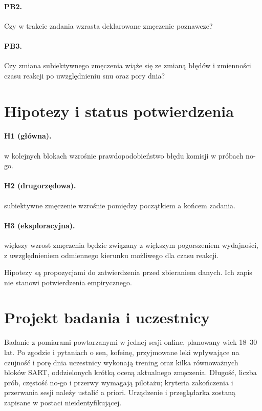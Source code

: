 \documentclass[11pt,a4paper]{article}
\begin{document}
\paragraph{PB2.} Czy w trakcie zadania wzrasta deklarowane zmęczenie poznawcze?

\paragraph{PB3.} Czy zmiana subiektywnego zmęczenia wiąże się ze zmianą błędów i zmienności czasu reakcji po uwzględnieniu snu oraz pory dnia?

\section{Hipotezy i status potwierdzenia}
\paragraph{H1 (główna).} w kolejnych blokach wzrośnie prawdopodobieństwo błędu komisji w próbach no-go.

\paragraph{H2 (drugorzędowa).} subiektywne zmęczenie wzrośnie pomiędzy początkiem a końcem zadania.

\paragraph{H3 (eksploracyjna).} większy wzrost zmęczenia będzie związany z większym pogorszeniem wydajności, z uwzględnieniem odmiennego kierunku możliwego dla czasu reakcji.

Hipotezy są propozycjami do zatwierdzenia przed zbieraniem danych. Ich zapis nie stanowi potwierdzenia empirycznego.
\section{Projekt badania i uczestnicy}
Badanie z pomiarami powtarzanymi w jednej sesji online, planowany wiek 18--30 lat. Po zgodzie i pytaniach o sen, kofeinę, przyjmowane leki wpływające na czujność i porę dnia uczestnicy wykonają trening oraz kilka równoważnych bloków SART, oddzielonych krótką oceną aktualnego zmęczenia. Długość, liczba prób, częstość no-go i przerwy wymagają pilotażu; kryteria zakończenia i przerwania sesji należy ustalić a priori. Urządzenie i przeglądarka zostaną zapisane w postaci nieidentyfikującej.
\end{document}
